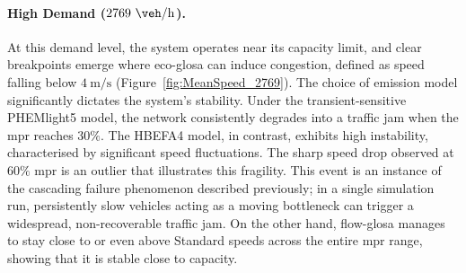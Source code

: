 \paragraph{High Demand ($2769~\unit{\veh\per\hour}$).}
At this demand level, the system operates near its capacity limit, and clear breakpoints emerge where \ac{eco-glosa} can induce congestion, defined as speed falling below $4~\unit{\metre\per\second}$ (Figure~\vref{fig:MeanSpeed_2769}). The choice of emission model significantly dictates the system's stability. Under the transient-sensitive PHEMlight5 model, the network consistently degrades into a traffic jam when the \ac{mpr} reaches $30\%$. The HBEFA4 model, in contrast, exhibits high instability, characterised by significant speed fluctuations. The sharp speed drop observed at $60\%$ \ac{mpr} is an outlier that illustrates this fragility. This event is an instance of the cascading failure phenomenon described previously; in a single simulation run, persistently slow vehicles acting as a moving bottleneck can trigger a widespread, non-recoverable traffic jam. On the other hand, \ac{flow-glosa} manages to stay close to or even above Standard speeds across the entire \ac{mpr} range, showing that it is stable close to capacity.

